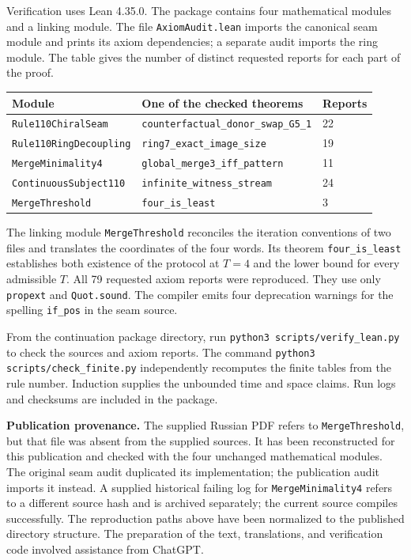 Verification uses Lean 4.35.0. The package contains four mathematical modules
and a linking module. The file \texttt{AxiomAudit.lean} imports the canonical
seam module and prints its axiom dependencies; a separate audit imports the
ring module. The table gives the number of distinct requested reports for
each part of the proof.

\begin{center}
\footnotesize
\begin{tabular}{@{}lll@{}}
\toprule
Module & One of the checked theorems & Reports\\
\midrule
\texttt{Rule110ChiralSeam} & \texttt{counterfactual\_donor\_swap\_G5\_1} & 22\\
\texttt{Rule110RingDecoupling} & \texttt{ring7\_exact\_image\_size} & 19\\
\texttt{MergeMinimality4} & \texttt{global\_merge3\_iff\_pattern} & 11\\
\texttt{ContinuousSubject110} & \texttt{infinite\_witness\_stream} & 24\\
\texttt{MergeThreshold} & \texttt{four\_is\_least} & 3\\
\bottomrule
\end{tabular}
\end{center}

The linking module \texttt{MergeThreshold} reconciles the iteration conventions
of two files and translates the coordinates of the four words. Its theorem
\texttt{four\_is\_least} establishes both existence of the protocol at $T=4$
and the lower bound for every admissible $T$. All 79 requested axiom reports
were reproduced. They use only \texttt{propext} and \texttt{Quot.sound}.
The compiler emits four deprecation warnings for the spelling \texttt{if\_pos}
in the seam source.

From the continuation package directory, run
\texttt{python3 scripts/verify\_lean.py} to check the sources and axiom reports.
The command \texttt{python3 scripts/check\_finite.py} independently recomputes
the finite tables from the rule number. Induction supplies the unbounded time
and space claims. Run logs and checksums are included in the package.

\noindent\textbf{Publication provenance.}
The supplied Russian PDF refers to \texttt{MergeThreshold}, but that file was
absent from the supplied sources. It has been reconstructed for this
publication and checked with the four unchanged mathematical modules.
The original seam audit duplicated its implementation; the publication audit
imports it instead. A supplied historical failing log for
\texttt{MergeMinimality4} refers to a different source hash and is archived
separately; the current source compiles successfully. The reproduction paths
above have been normalized to the published directory structure.
The preparation of the text, translations, and verification code involved
assistance from ChatGPT.
